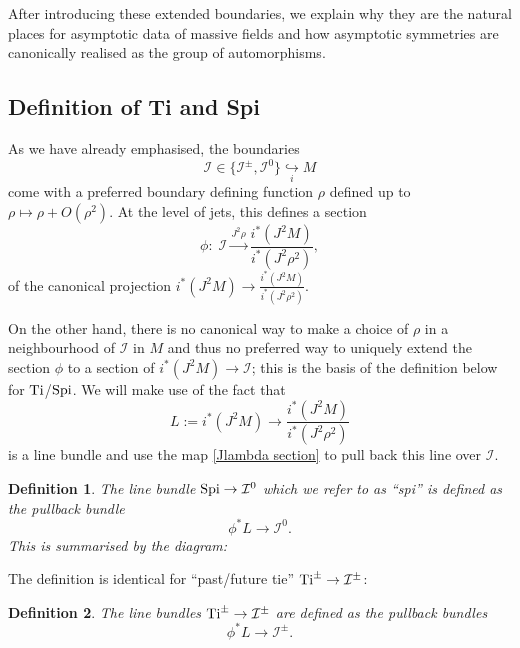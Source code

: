 \documentclass[a4paper, 10pt]{article}
\newtheorem{definition}{Definition}[section]
\theoremstyle{remark}
\newcommand{\Ti}{\textnormal{Ti}}
\newcommand{\Spi}{\textnormal{Spi}}
\begin{document}
After introducing these extended boundaries, we explain why they are the natural places for asymptotic data of massive fields and how asymptotic symmetries are canonically realised as the group of automorphisms.

\subsection{Definition of Ti and Spi}\label{Subsection: definition Ti/Spi}

As we have already emphasised, the boundaries
\begin{equation}
    \mathcal{I}\in \{\mathcal{I}^{\pm}, \mathcal{I}^{0}\} \underset{i}{\hookrightarrow} M
\end{equation}
come with a preferred boundary defining function $\rho$ defined up to $\rho \mapsto \rho + O(\rho^2)$. At the level of jets, this defines a section
 \begin{equation}\label{Jlambda section}
 	\phi:\;  \mathcal{I} \xrightarrow{J^2 \rho}  \frac{i^*\left(J^2 M\right)}{ i^* \left(J^2 \rho^2\right)},
 \end{equation}
 of the canonical projection $i^*(J^2M) \rightarrow \frac{i^*(J^2M)}{i^*(J^2\rho^2)}$.
 
On the other hand, there is no canonical way to make a choice of $\rho$ in a neighbourhood of $\mathcal{I}$ in $M$ and thus no preferred way to uniquely extend the section $\phi$ to a section of $i^*\left(J^2M\right) \to \mathcal{I}$; this is the basis of the definition below for $\Ti$/$\Spi$. We will make use of the fact that 
\begin{equation}
   L := i^*\left(J^2M\right) \to  \frac{i^*\left(J^2M\right)}{ i^* \left(J^2 \rho^2\right)}
\end{equation}
is a line bundle and use the map \eqref{Jlambda section} to pull back this line over $\mathcal{I}$.

\begin{definition}\label{Definition: Spi}\mbox{}
The line bundle $\Spi \to \mathcal{I}^{0}$ which we refer to as ``spi'' is defined as the pullback bundle
\begin{equation}
\phi^* L \longrightarrow \mathcal{I}^{0}.
\end{equation}
This is summarised by the diagram:
\begin{center}
\end{center}
\end{definition}
The definition is identical for ``past/future tie'' $\Ti^{\pm} \to \mathcal{I}^{\pm}$:
\begin{definition}\label{Definition: Ti}\mbox{}
The line bundles $\Ti^{\pm} \to \mathcal{I}^{\pm}$ are defined as the pullback bundles
\begin{equation}
\phi^* L \longrightarrow \mathcal{I}^{\pm}.
\end{equation}
\end{definition}
\end{document}
